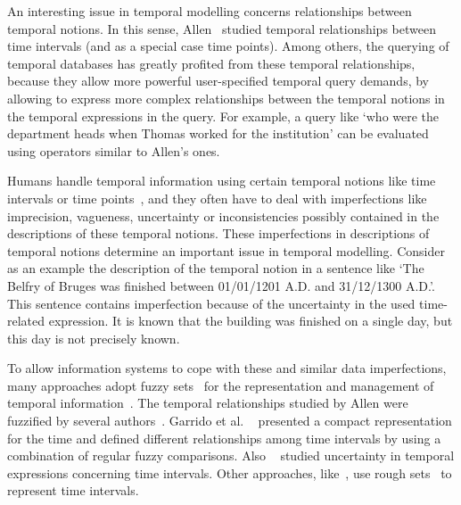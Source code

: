 An interesting issue in temporal modelling concerns relationships between temporal notions. In this sense, Allen~\cite{Allen1983} studied temporal relationships between time intervals (and as a special case time points). Among others, the querying of temporal databases has greatly profited from these temporal relationships, because they allow more powerful user-specified temporal query demands, by allowing to express more complex relationships between the temporal notions in the temporal expressions in the query. For example, a query like `who were the department heads when Thomas worked for the institution' can be evaluated using operators similar to Allen's ones.

Humans handle temporal information using certain temporal notions like time intervals or time points~\cite{Dyreson1994}, and they often have to deal with imperfections like imprecision, vagueness, uncertainty or inconsistencies possibly contained in the descriptions of these temporal notions. These imperfections in descriptions of temporal notions determine an important issue in temporal modelling. Consider as an example the description of the temporal notion in a sentence like `The Belfry of Bruges was finished between 01/01/1201 A.D. and 31/12/1300 A.D.'. This sentence contains imperfection because of the uncertainty in the used time-related expression. It is known that the building was finished on a single day, but this day is not precisely known.

To allow information systems to cope with these and similar data imperfections, many approaches adopt fuzzy sets~\cite{Zadeh1965} for the representation and management of temporal information~\cite{Mitra1994,Nagypal2003,Billiet2011,Dubois1983,Dubois2003}. The temporal relationships studied by Allen were fuzzified by several authors~\cite{Ohlbach2004,Nagypal2003,Schockaert2008}.   Garrido et al. ~\cite{Garrido2009} presented a compact representation for the time and defined different relationships among time intervals by using a combination of regular fuzzy comparisons. Also ~\cite{Garrido2009,Pons2011} studied uncertainty in temporal expressions concerning time intervals. Other approaches, like~\cite{Qiang2009}, use rough sets~\cite{Pawlak1995} to represent time intervals.

